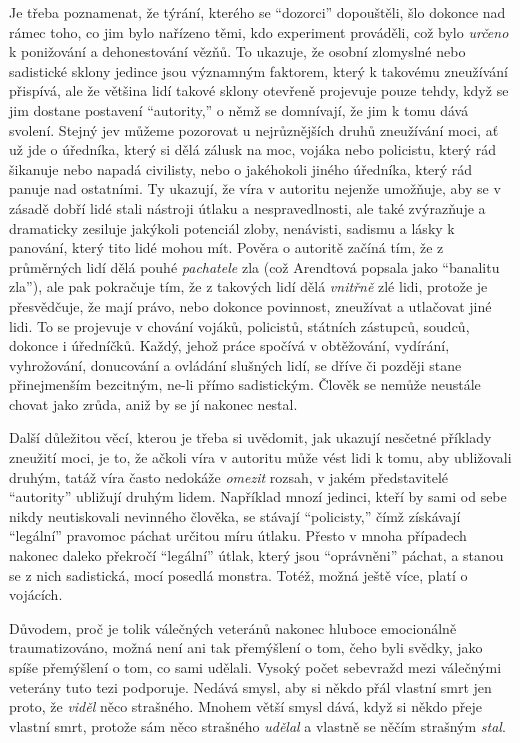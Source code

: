 \documentclass{book}
\begin{document}
Je třeba poznamenat, že týrání, kterého se \enquote{dozorci} dopouštěli, šlo dokonce nad rámec toho, co jim bylo nařízeno těmi, kdo experiment prováděli, což bylo \emph{určeno} k ponižování a dehonestování vězňů. To ukazuje, že osobní zlomyslné nebo sadistické sklony jedince jsou významným faktorem, který k takovému zneužívání přispívá, ale že většina lidí takové sklony otevřeně projevuje pouze tehdy, když se jim dostane postavení \enquote{autority,} o němž se domnívají, že jim k tomu dává svolení. Stejný jev můžeme pozorovat u nejrůznějších druhů zneužívání moci, ať už jde o úředníka, který si dělá zálusk na moc, vojáka nebo policistu, který rád šikanuje nebo napadá civilisty, nebo o jakéhokoli jiného úředníka, který rád panuje nad ostatními. Ty ukazují, že víra v autoritu nejenže umožňuje, aby se v zásadě dobří lidé stali nástroji útlaku a nespravedlnosti, ale také zvýrazňuje a dramaticky zesiluje jakýkoli potenciál zloby, nenávisti, sadismu a lásky k panování, který tito lidé mohou mít. Pověra o autoritě začíná tím, že z průměrných lidí dělá pouhé \emph{pachatele} zla (což Arendtová popsala jako \enquote{banalitu zla}), ale pak pokračuje tím, že z takových lidí dělá \emph{vnitřně} zlé lidi, protože je přesvědčuje, že mají právo, nebo dokonce povinnost, zneužívat a utlačovat jiné lidi. To se projevuje v chování vojáků, policistů, státních zástupců, soudců, dokonce i úředníčků. Každý, jehož práce spočívá v obtěžování, vydírání, vyhrožování, donucování a ovládání slušných lidí, se dříve či později stane přinejmenším bezcitným, ne-li přímo sadistickým. Člověk se nemůže neustále chovat jako zrůda, aniž by se jí nakonec nestal.

Další důležitou věcí, kterou je třeba si uvědomit, jak ukazují nesčetné příklady zneužití moci, je to, že ačkoli víra v autoritu může vést lidi k tomu, aby ubližovali druhým, tatáž víra často nedokáže \emph{omezit} rozsah, v jakém představitelé \enquote{autority} ubližují druhým lidem. Například mnozí jedinci, kteří by sami od sebe nikdy neutiskovali nevinného člověka, se stávají \enquote{policisty,} čímž získávají \enquote{legální} pravomoc páchat určitou míru útlaku. Přesto v mnoha případech nakonec daleko překročí \enquote{legální} útlak, který jsou \enquote{oprávněni} páchat, a stanou se z nich sadistická, mocí posedlá monstra. Totéž, možná ještě více, platí o vojácích.

Důvodem, proč je tolik válečných veteránů nakonec hluboce emocionálně traumatizováno, možná není ani tak přemýšlení o tom, čeho byli svědky, jako spíše přemýšlení o tom, co sami udělali. Vysoký počet sebevražd mezi válečnými veterány tuto tezi podporuje. Nedává smysl, aby si někdo přál vlastní smrt jen proto, že \emph{viděl} něco strašného. Mnohem větší smysl dává, když si někdo přeje vlastní smrt, protože sám něco strašného \emph{udělal} a vlastně se něčím strašným \emph{stal}.
\end{document}
